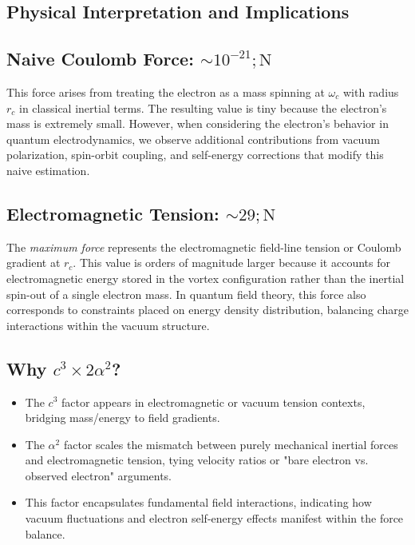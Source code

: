 \subsection*{Physical Interpretation and Implications}


\subsection{Naive Coulomb Force: $\sim 10^{-21} ; \mathrm{N}$}


This force arises from treating the electron as a mass spinning at $\omega_c$ with radius $r_c$ in classical inertial terms. The resulting value is tiny because the electron’s mass is extremely small. However, when considering the electron’s behavior in quantum electrodynamics, we observe additional contributions from vacuum polarization, spin-orbit coupling, and self-energy corrections that modify this naive estimation.


\subsection{Electromagnetic Tension: $\sim 29 ; \mathrm{N}$}


The \textit{maximum force} represents the electromagnetic field-line tension or Coulomb gradient at $r_c$. This value is orders of magnitude larger because it accounts for electromagnetic energy stored in the vortex configuration rather than the inertial spin-out of a single electron mass. In quantum field theory, this force also corresponds to constraints placed on energy density distribution, balancing charge interactions within the vacuum structure.


\subsection{Why $c^3 \times 2 \alpha^2$?}


\begin{itemize}
\item The $c^3$ factor appears in electromagnetic or vacuum tension contexts, bridging mass/energy to field gradients.
\item The $\alpha^2$ factor scales the mismatch between purely mechanical inertial forces and electromagnetic tension, tying velocity ratios or "bare electron vs. observed electron" arguments.
\item This factor encapsulates fundamental field interactions, indicating how vacuum fluctuations and electron self-energy effects manifest within the force balance.
\end{itemize}


